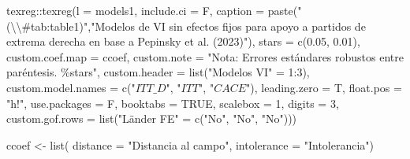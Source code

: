 \documentclass[
  12pt,
  a4paper,
]{article}
\newenvironment{Shaded}{\begin{snugshade}}{\end{snugshade}}
\newcommand{\AttributeTok}[1]{\textcolor[rgb]{0.77,0.63,0.00}{#1}}
\newcommand{\ConstantTok}[1]{\textcolor[rgb]{0.00,0.00,0.00}{#1}}
\newcommand{\DecValTok}[1]{\textcolor[rgb]{0.00,0.00,0.81}{#1}}
\newcommand{\FloatTok}[1]{\textcolor[rgb]{0.00,0.00,0.81}{#1}}
\newcommand{\FunctionTok}[1]{\textcolor[rgb]{0.00,0.00,0.00}{#1}}
\newcommand{\NormalTok}[1]{#1}
\newcommand{\OtherTok}[1]{\textcolor[rgb]{0.56,0.35,0.01}{#1}}
\newcommand{\SpecialCharTok}[1]{\textcolor[rgb]{0.00,0.00,0.00}{#1}}
\newcommand{\StringTok}[1]{\textcolor[rgb]{0.31,0.60,0.02}{#1}}
\begin{document}
\begin{Shaded}
\begin{Highlighting}[]
\NormalTok{texreg}\SpecialCharTok{::}\FunctionTok{texreg}\NormalTok{(}\AttributeTok{l =}\NormalTok{ models1,}
               \AttributeTok{include.ci =}\NormalTok{ F,}
               \AttributeTok{caption =} \FunctionTok{paste}\NormalTok{(}\StringTok{"(}\SpecialCharTok{\textbackslash{}\textbackslash{}}\StringTok{\#tab:table1)"}\NormalTok{,}\StringTok{"Modelos de VI sin efectos fijos para apoyo a partidos de extrema derecha en base a Pepinsky et al. (2023)"}\NormalTok{),}
               \AttributeTok{stars =} \FunctionTok{c}\NormalTok{(}\FloatTok{0.05}\NormalTok{, }\FloatTok{0.01}\NormalTok{),}
               \AttributeTok{custom.coef.map =}\NormalTok{ ccoef,}
               \AttributeTok{custom.note =} \StringTok{"Nota: Errores estándares robustos entre paréntesis. \%stars"}\NormalTok{,}
               \AttributeTok{custom.header =} \FunctionTok{list}\NormalTok{(}\StringTok{"Modelos VI"} \OtherTok{=} \DecValTok{1}\SpecialCharTok{:}\DecValTok{3}\NormalTok{),}
               \AttributeTok{custom.model.names =} \FunctionTok{c}\NormalTok{(}\StringTok{"$ITT\_D$"}\NormalTok{, }\StringTok{"$ITT$"}\NormalTok{, }\StringTok{"$CACE$"}\NormalTok{),}
               \AttributeTok{leading.zero =}\NormalTok{ T,}
               \AttributeTok{float.pos =} \StringTok{"h!"}\NormalTok{,}
               \AttributeTok{use.packages =}\NormalTok{ F,}
               \AttributeTok{booktabs =} \ConstantTok{TRUE}\NormalTok{,}
               \AttributeTok{scalebox =} \DecValTok{1}\NormalTok{,}
               \AttributeTok{digits =} \DecValTok{3}\NormalTok{,}
               \AttributeTok{custom.gof.rows =} \FunctionTok{list}\NormalTok{(}\StringTok{"Länder FE"} \OtherTok{=} \FunctionTok{c}\NormalTok{(}\StringTok{"No"}\NormalTok{, }\StringTok{"No"}\NormalTok{, }\StringTok{"No"}\NormalTok{)))}



\NormalTok{ccoef }\OtherTok{\textless{}{-}} \FunctionTok{list}\NormalTok{(}
  \AttributeTok{distance =} \StringTok{"Distancia al campo"}\NormalTok{,}
  \AttributeTok{intolerance =} \StringTok{"Intolerancia"}\NormalTok{)}


\end{Highlighting}
\end{Shaded}
\end{document}

